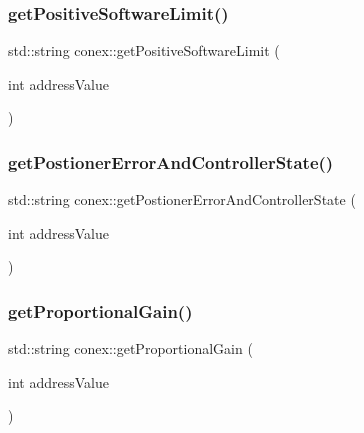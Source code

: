 \subsubsection{\texorpdfstring{get\+Positive\+Software\+Limit()}{getPositiveSoftwareLimit()}}
{\footnotesize\ttfamily std\+::string conex\+::get\+Positive\+Software\+Limit (\begin{DoxyParamCaption}\item[{int}]{address\+Value }\end{DoxyParamCaption})}

\mbox{\label{namespaceconex_ab160c5ab9d6870ec2fdf198fede98ebd}} 
\subsubsection{\texorpdfstring{get\+Postioner\+Error\+And\+Controller\+State()}{getPostionerErrorAndControllerState()}}
{\footnotesize\ttfamily std\+::string conex\+::get\+Postioner\+Error\+And\+Controller\+State (\begin{DoxyParamCaption}\item[{int}]{address\+Value }\end{DoxyParamCaption})}

\mbox{\label{namespaceconex_a0ed457be041ec821472eb60ef3f7768d}} 
\subsubsection{\texorpdfstring{get\+Proportional\+Gain()}{getProportionalGain()}}
{\footnotesize\ttfamily std\+::string conex\+::get\+Proportional\+Gain (\begin{DoxyParamCaption}\item[{int}]{address\+Value }\end{DoxyParamCaption})}

\mbox{\label{namespaceconex_a7c219ac12ae0d8c2385cbf3ef5aa2ed2}} 
